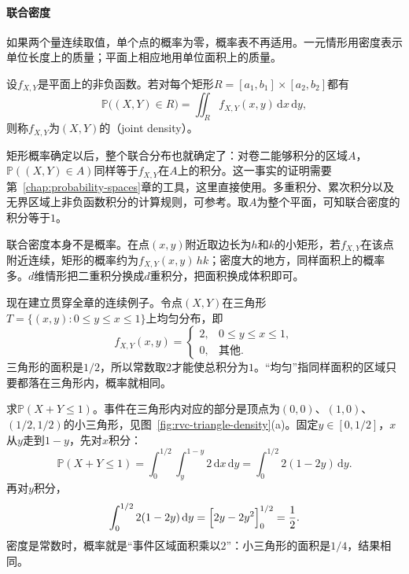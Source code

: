 \paragraph{联合密度}
如果两个量连续取值，单个点的概率为零，概率表不再适用。一元情形用密度表示单位长度上的质量；平面上相应地用单位面积上的质量。

\begin{definition}[联合密度]
\label{def:rvc-joint-density}
设$f_{X,Y}$是平面上的非负函数。若对每个矩形$R=[a_1,b_1]\times[a_2,b_2]$都有
\begin{equation}
 \mathbb{P}\bigl((X,Y)\in R\bigr)=\iint_{R}f_{X,Y}(x,y)\,\mathrm{d}x\,\mathrm{d}y,
 \label{eq:rvc-joint-density}
\end{equation}
则称$f_{X,Y}$为$(X,Y)$的（joint density）。
\end{definition}

矩形概率确定以后，整个联合分布也就确定了：对卷二能够积分的区域$A$，$\mathbb{P}((X,Y)\in A)$同样等于$f_{X,Y}$在$A$上的积分。这一事实的证明需要第~\ref{chap:probability-spaces}章的工具，这里直接使用。多重积分、累次积分以及无界区域上非负函数积分的计算规则，可参考。取$A$为整个平面，可知联合密度的积分等于$1$。

联合密度本身不是概率。在点$(x,y)$附近取边长为$h$和$k$的小矩形，若$f_{X,Y}$在该点附近连续，矩形的概率约为$f_{X,Y}(x,y)\,hk$；密度大的地方，同样面积上的概率多。$d$维情形把二重积分换成$d$重积分，把面积换成体积即可。

现在建立贯穿全章的连续例子。令点$(X,Y)$在三角形$T=\{(x,y):0\leq y\leq x\leq 1\}$上均匀分布，即
\begin{equation}
 f_{X,Y}(x,y)=\begin{cases}2,&0\leq y\leq x\leq 1,\\0,&\text{其他}.\end{cases}
 \label{eq:rvc-triangle-density}
\end{equation}
三角形的面积是$1/2$，所以常数取$2$才能使总积分为$1$。“均匀”指同样面积的区域只要都落在三角形内，概率就相同。

求$\mathbb{P}(X+Y\leq 1)$。事件在三角形内对应的部分是顶点为$(0,0)$、$(1,0)$、$(1/2,1/2)$的小三角形，见图~\ref{fig:rvc-triangle-density}(a)。固定$y\in[0,1/2]$，$x$从$y$走到$1-y$，先对$x$积分：
\[
 \mathbb{P}(X+Y\leq 1)=\int_{0}^{1/2}\!\!\int_{y}^{1-y}2\,\mathrm{d}x\,\mathrm{d}y
 =\int_{0}^{1/2}2(1-2y)\,\mathrm{d}y.
\]
再对$y$积分，
\[
 \int_{0}^{1/2}2(1-2y)\,\mathrm{d}y=\Bigl[2y-2y^{2}\Bigr]_{0}^{1/2}=\frac12 .
\]
密度是常数时，概率就是“事件区域面积乘以$2$”：小三角形的面积是$1/4$，结果相同。

